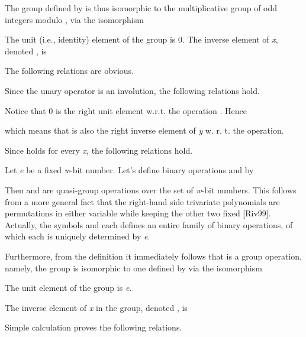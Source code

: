 \documentclass[a4paper,oneside,english]{amsart}
\numberwithin{equation}{section}
\numberwithin{figure}{section}
\begin{document}
The group defined by  is thus isomorphic to the multiplicative
group of odd integers modulo , via the isomorphism 



The unit (i.e., identity) element of the group is 0. The inverse element
of \emph{x}, denoted , is 




The following relations are obvious. 







Since the unary operator  is an involution, the following
relations hold.







Notice that 0 is the right unit element w.r.t. the operation .
Hence


which means that  is also the right inverse element of \emph{y}
w. r. t. the  operation. 

Since  holds for every \emph{x}, the
following relations hold.







Let \emph{e} be a fixed \emph{w}-bit number. Let's define binary operations
 and  by 







Then  and  are quasi-group
operations over the set of \emph{w}-bit numbers. This follows from
a more general fact that the right-hand side trivariate polynomials
are permutations in either variable while keeping the other two fixed
{[}Riv99{]}. Actually, the symbols  and 
each defines an entire family of binary operations, of which each
is uniquely determined by \emph{e}.

Furthermore, from the definition it immediately follows that 
is a group operation, namely, the group is isomorphic to one defined
by  via the isomorphism




The unit element of the group is \emph{e}. 

The inverse element of \emph{x} in the group, denoted ,
is




Simple calculation proves the following relations.
\end{document}
